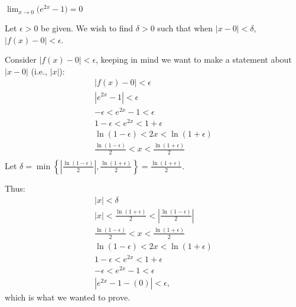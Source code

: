 {$\displaystyle \lim_{x\to 0} \big(e^{2x}-1\big) = 0$}
{Let $\epsilon >0$ be given. We wish to find $\delta >0$ such that when $|x-0|<\delta$, $|f(x)-0|<\epsilon$. 

Consider $|f(x)-0|<\epsilon$, keeping in  mind we want to make a statement about $|x-0|$ (i.e., $|x|$):
\begin{gather*}
|f(x) -0 | < \epsilon \\
|e^{2x}-1 |<\epsilon \\
-\epsilon< e^{2x}-1 < \epsilon \\
1-\epsilon< e^{2x} < 1+\epsilon \\
\ln (1-\epsilon) < 2x < \ln (1+\epsilon) \\
\frac{\ln (1-\epsilon)}{2} < x < \frac{\ln (1+\epsilon)}{2} \\
\end{gather*}
Let $\delta = \min\left\{\left|\frac{\ln(1-\epsilon)}{2}\right|,\frac{\ln(1+\epsilon)}{2}\right\}=\frac{\ln(1+\epsilon)}{2}.$

Thus:
\begin{gather*}
|x| < \delta \\
|x| <\frac{\ln(1+\epsilon)}{2}<\left|\frac{\ln(1-\epsilon)}{2}\right| \\
\frac{\ln(1-\epsilon)}{2} < x < \frac{\ln(1+\epsilon)}{2}\\
\ln(1-\epsilon)< 2x < \ln(1+\epsilon)\\
1-\epsilon < e^{2x} < 1+\epsilon\\
-\epsilon < e^{2x}-1 < \epsilon\\
|e^{2x}-1-(0)| < \epsilon,
\end{gather*}
which is what we wanted to prove.
}




